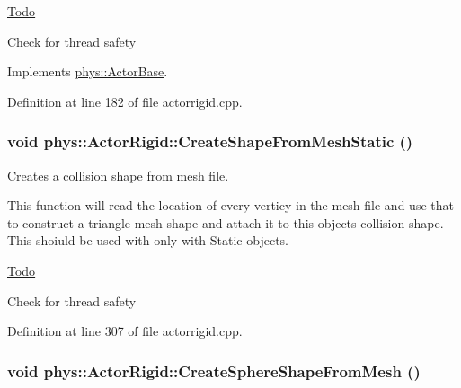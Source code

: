 \begin{Desc}
\item[\hyperlink{todo__todo000001}{Todo}]
\begin{DoxyItemize}
\item Check for thread safety 
\end{DoxyItemize}\end{Desc}




Implements \hyperlink{classphys_1_1ActorBase_aa41370f6d2031a9dad8df45bd7f3bcc6}{phys::ActorBase}.



Definition at line 182 of file actorrigid.cpp.

\hypertarget{classphys_1_1ActorRigid_a84554dcaaf2475ba0ec7dcb9235050ac}{
\subsubsection[{CreateShapeFromMeshStatic}]{\setlength{\rightskip}{0pt plus 5cm}void phys::ActorRigid::CreateShapeFromMeshStatic ()}}
\label{d8/d71/classphys_1_1ActorRigid_a84554dcaaf2475ba0ec7dcb9235050ac}


Creates a collision shape from mesh file. 

This function will read the location of every verticy in the mesh file and use that to construct a triangle mesh shape and attach it to this objects collision shape. This shoiuld be used with only with Static objects. 

\begin{Desc}
\item[\hyperlink{todo__todo000002}{Todo}]
\begin{DoxyItemize}
\item Check for thread safety 
\end{DoxyItemize}\end{Desc}




Definition at line 307 of file actorrigid.cpp.

\hypertarget{classphys_1_1ActorRigid_ae401c116a07ee4ed3fc677e83308fba5}{
\subsubsection[{CreateSphereShapeFromMesh}]{\setlength{\rightskip}{0pt plus 5cm}void phys::ActorRigid::CreateSphereShapeFromMesh ()}}
\label{d8/d71/classphys_1_1ActorRigid_ae401c116a07ee4ed3fc677e83308fba5}


